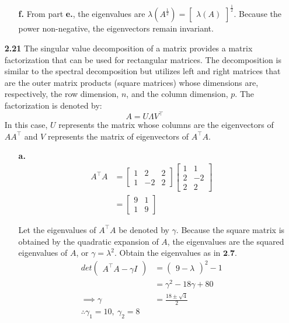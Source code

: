 \documentclass[oneside,12pt,letterpaper]{article}
\begin{document}
\begin{enumerate}
\begin{enumerate}
				\item[\textbf{f.}]
					From part \textbf{e.}, the eigenvalues are $\lambda(A^{\frac{1}{2}}) = \begin{bmatrix} \lambda(A) \end{bmatrix}^{\frac{1}{2}}$. Because the power non-negative, the eigenvectors remain invariant.

			\end{enumerate}
		
		\pagebreak
		\item[\textbf{2.21}]
			The singular value decomposition of a matrix provides a matrix factorization that can be used for rectangular matrices. The decomposition is similar to the spectral decomposition but utilizes left and right matrices that are the outer matrix products (square matrices) whose dimensions are, respectively, the row dimension, $n$, and the column dimension, $p$. The factorization is denoted by: $$A = U \Lambda V^\intercal$$ In this case, $U$ represents the matrix whose columns are the eigenvectors of $AA^\intercal$ and $V$ represents the matrix of eigenvectors of $A^\intercal A$.
			
			\begin{enumerate}
				\item[\textbf{a.}]
					\begin{align*}
						A^\intercal A &= 
						\begin{bmatrix}
							1 & 2 & 2 \\
							1 & -2 & 2
						\end{bmatrix}
						\begin{bmatrix}
							1 & 1 \\
							2 & -2 \\
							2 & 2
						\end{bmatrix} \\
													&=
													\begin{bmatrix}
														9 & 1 \\
														1 & 9
													\end{bmatrix}
					\end{align*}
					
					Let the eigenvalues of $A^{\intercal} A$ be denoted by $\gamma$. Because the square matrix is obtained by the quadratic expansion of $A$, the eigenvalues are the squared eigenvalues of $A$, or $\gamma = \lambda^{2}$. Obtain the eigenvalues as in $\textbf{2.7}$.
					\begin{align*}
						det \begin{pmatrix} A^{\intercal} A - \gamma I \end{pmatrix} &= \begin{pmatrix} 9 - \lambda \end{pmatrix}^{2} - 1 \\
						&= \gamma^{2} - 18 \gamma + 80 \\
						\implies \gamma &= \frac{18 \pm \sqrt{4}}{2} \\
						\therefore \gamma_{1} = 10,\ \gamma_{2} = 8
					\end{align*}
					

\end{enumerate}
\end{enumerate}
\end{document}
